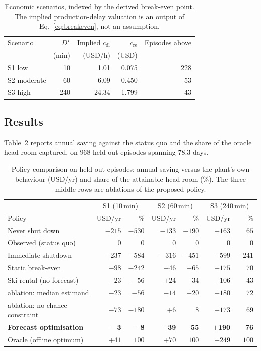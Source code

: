 \begin{table}[t]
\centering
\caption{Economic scenarios, indexed by the derived break-even point.
The implied production-delay valuation is an output of
Eq.~\eqref{eq:breakeven}, not an assumption.}
\label{tab:decision:scenarios}
\begin{tabular}{lrrrr}
\hline
Scenario & $D^{\star}$ & Implied $c_{\text{dl}}$ & $c_{\text{re}}$ & Episodes above \\
         & (min) & (USD/h) & (USD) & \\
\hline
S1 low       &  10 &  1.01 & 0.075 & 228 \\
S2 moderate  &  60 &  6.09 & 0.450 &  53 \\
S3 high      & 240 & 24.34 & 1.799 &  43 \\
\hline
\end{tabular}
\end{table}

\subsection{Results}
\label{sec:decision:results}

Table~\ref{tab:decision:policies} reports annual saving against the
status quo and the share of the oracle head-room captured, on $968$
held-out episodes spanning $78.3$ days.

\begin{table}[t]
\centering
\caption{Policy comparison on held-out episodes: annual saving versus
the plant's own behaviour (USD/yr) and share of the attainable head-room
(\%). The three middle rows are ablations of the proposed policy.}
\label{tab:decision:policies}
\begin{tabular}{lrrrrrr}
\hline
& \multicolumn{2}{c}{S1 (10\,min)} & \multicolumn{2}{c}{S2 (60\,min)} & \multicolumn{2}{c}{S3 (240\,min)}\\
Policy & USD/yr & \% & USD/yr & \% & USD/yr & \% \\
\hline
Never shut down            & $-215$ & $-530$ & $-133$ & $-190$ & $+163$ & $65$ \\
Observed (status quo)      & $0$ & $0$ & $0$ & $0$ & $0$ & $0$ \\
Immediate shutdown         & $-237$ & $-584$ & $-316$ & $-451$ & $-599$ & $-241$ \\
Static break-even          & $-98$ & $-242$ & $-46$ & $-65$ & $+175$ & $70$ \\
Ski-rental (no forecast)   & $-23$ & $-56$ & $+24$ & $34$ & $+106$ & $43$ \\
\quad ablation: median estimand      & $-23$ & $-56$ & $-14$ & $-20$ & $+180$ & $72$ \\
\quad ablation: no chance constraint & $-73$ & $-180$ & $+6$ & $8$ & $+173$ & $69$ \\
\textbf{Forecast optimisation}       & $\mathbf{-3}$ & $\mathbf{-8}$ & $\mathbf{+39}$ & $\mathbf{55}$ & $\mathbf{+190}$ & $\mathbf{76}$ \\
Oracle (offline optimum)   & $+41$ & $100$ & $+70$ & $100$ & $+249$ & $100$ \\
\hline
\end{tabular}
\end{table}

